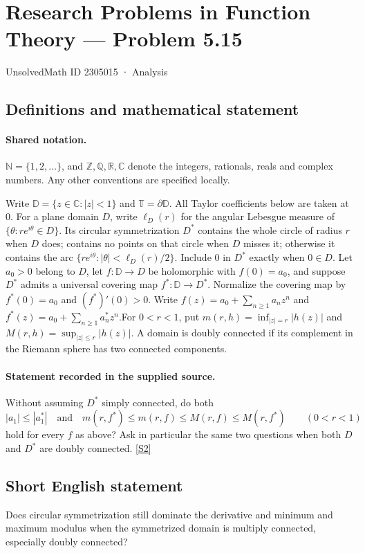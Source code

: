 \documentclass[11pt]{article}
\newcommand{\sref}[2]{\hyperlink{source:#1:#2}{[S#2]}}
\begin{document}
\setcounter{section}{2305014}
\section{Research Problems in Function Theory — Problem 5.15}\label{2305015}
{\small\sffamily UnsolvedMath ID 2305015 · Analysis}
\subsection{Definitions and mathematical statement}

\paragraph{Shared notation.}$\mathbb N=\{1,2,\ldots\}$, and $\mathbb Z,\mathbb Q,\mathbb R,\mathbb C$ denote the integers, rationals, reals and complex numbers. Any other conventions are specified locally.


Write $\mathbb D=\{z\in\mathbb C:|z|<1\}$ and $\mathbb T=\partial\mathbb D$. All Taylor coefficients below are taken at $0$. For a plane domain $D$, write $\ell_D(r)$ for the angular Lebesgue measure of $\{\theta:re^{i\theta}\in D\}$. Its circular symmetrization $D^*$ contains the whole circle of radius $r$ when $D$ does; contains no points on that circle when $D$ misses it; otherwise it contains the arc $\{re^{i\theta}:|\theta|<\ell_D(r)/2\}$. Include $0$ in $D^*$ exactly when $0\in D$. Let $a_0>0$ belong to $D$, let $f:\mathbb D\to D$ be holomorphic with $f(0)=a_0$, and suppose $D^*$ admits a universal covering map $f^*:\mathbb D\to D^*$. Normalize the covering map by $f^*(0)=a_0$ and $(f^*)'(0)>0$. Write $f(z)=a_0+\sum_{n\ge1}a_nz^n$ and $f^*(z)=a_0+\sum_{n\ge1}a_n^*z^n$.For $0<r<1$, put $m(r,h)=\inf_{|z|=r}|h(z)|$ and $M(r,h)=\sup_{|z|\le r}|h(z)|$. A domain is doubly connected if its complement in the Riemann sphere has two connected components.
\paragraph{Statement recorded in the supplied source.}
Without assuming $D^*$ simply connected, do both
\[|a_1|\le |a_1^*|\quad\text{and}\quad m(r,f^*)\le m(r,f)\le M(r,f)\le M(r,f^*)\qquad(0<r<1)\]
hold for every $f$ as above? Ask in particular the same two questions when both $D$ and $D^*$ are doubly connected. \sref{2305015}{2}
\subsection{Short English statement}
Does circular symmetrization still dominate the derivative and minimum and maximum modulus when the symmetrized domain is multiply connected, especially doubly connected?
\end{document}

